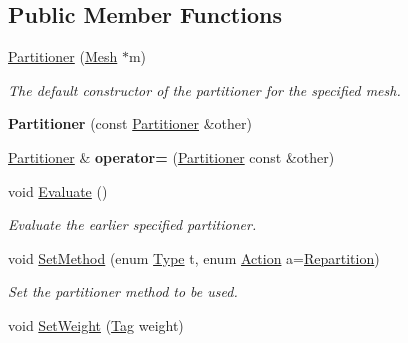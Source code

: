 \subsection*{Public Member Functions}
\begin{DoxyCompactItemize}
\item 
\hypertarget{classINMOST_1_1Partitioner_a3aeebab26c4e59b6d4207f2066883283}{\hyperlink{classINMOST_1_1Partitioner_a3aeebab26c4e59b6d4207f2066883283}{Partitioner} (\hyperlink{classINMOST_1_1Mesh}{Mesh} $\ast$m)}\label{classINMOST_1_1Partitioner_a3aeebab26c4e59b6d4207f2066883283}

\begin{DoxyCompactList}\small\item\em The default constructor of the partitioner for the specified mesh. \end{DoxyCompactList}\item 
\hypertarget{classINMOST_1_1Partitioner_a078dfb29545637a627e830c50749c36f}{{\bfseries Partitioner} (const \hyperlink{classINMOST_1_1Partitioner}{Partitioner} \&other)}\label{classINMOST_1_1Partitioner_a078dfb29545637a627e830c50749c36f}

\item 
\hypertarget{classINMOST_1_1Partitioner_a3ef0bfba7413f977879176dba9be6c35}{\hyperlink{classINMOST_1_1Partitioner}{Partitioner} \& {\bfseries operator=} (\hyperlink{classINMOST_1_1Partitioner}{Partitioner} const \&other)}\label{classINMOST_1_1Partitioner_a3ef0bfba7413f977879176dba9be6c35}

\item 
void \hyperlink{classINMOST_1_1Partitioner_aafc007c0dce3a6cde19d3de8afd0bb7f}{Evaluate} ()
\begin{DoxyCompactList}\small\item\em Evaluate the earlier specified partitioner. \end{DoxyCompactList}\item 
void \hyperlink{classINMOST_1_1Partitioner_aec7573d66aaf19911e990561b47236eb}{Set\-Method} (enum \hyperlink{classINMOST_1_1Partitioner_a0699b96f7945e283398750d585eca311}{Type} t, enum \hyperlink{classINMOST_1_1Partitioner_a0a4053a79855f16dbb53c13b39bc75c3}{Action} a=\hyperlink{classINMOST_1_1Partitioner_a0a4053a79855f16dbb53c13b39bc75c3ae667d6f0560495262c0010866080eff8}{Repartition})
\begin{DoxyCompactList}\small\item\em Set the partitioner method to be used. \end{DoxyCompactList}\item 
\hypertarget{classINMOST_1_1Partitioner_a48e793e9e60e7438b2f5504f9bf5bccd}{void \hyperlink{classINMOST_1_1Partitioner_a48e793e9e60e7438b2f5504f9bf5bccd}{Set\-Weight} (\hyperlink{classINMOST_1_1Tag}{Tag} weight)}\label{classINMOST_1_1Partitioner_a48e793e9e60e7438b2f5504f9bf5bccd}


\end{DoxyCompactItemize}
